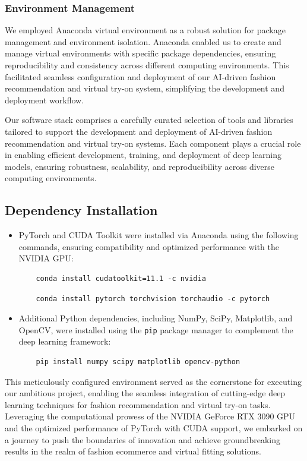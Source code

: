   
  \subsubsection{Environment Management}
  We employed Anaconda virtual environment as a robust solution for package management and environment isolation. Anaconda enabled us to create and manage virtual environments with specific package dependencies, ensuring reproducibility and consistency across different computing environments. This facilitated seamless configuration and deployment of our AI-driven fashion recommendation and virtual try-on system, simplifying the development and deployment workflow.

Our software stack comprises a carefully curated selection of tools and libraries tailored to support the development and deployment of AI-driven fashion recommendation and virtual try-on systems. Each component plays a crucial role in enabling efficient development, training, and deployment of deep learning models, ensuring robustness, scalability, and reproducibility across diverse computing environments.

\subsection{Dependency Installation}
\begin{itemize}
  \item PyTorch and CUDA Toolkit were installed via Anaconda using the following commands, ensuring compatibility and optimized performance with the NVIDIA GPU:
    \begin{verbatim}
    conda install cudatoolkit=11.1 -c nvidia
    \end{verbatim}
    \begin{verbatim}
    conda install pytorch torchvision torchaudio -c pytorch
    \end{verbatim}


  \item Additional Python dependencies, including NumPy, SciPy, Matplotlib, and OpenCV, were installed using the \texttt{pip} package manager to complement the deep learning framework:
    \begin{verbatim}
    pip install numpy scipy matplotlib opencv-python
    \end{verbatim}
\end{itemize}

This meticulously configured environment served as the cornerstone for executing our ambitious project, enabling the seamless integration of cutting-edge deep learning techniques for fashion recommendation and virtual try-on tasks. Leveraging the computational prowess of the NVIDIA GeForce RTX 3090 GPU and the optimized performance of PyTorch with CUDA support, we embarked on a journey to push the boundaries of innovation and achieve groundbreaking results in the realm of fashion ecommerce and virtual fitting solutions.

